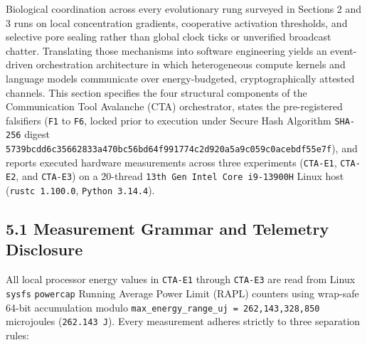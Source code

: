 \documentclass[10pt,letterpaper]{article}
\begin{document}
Biological coordination across every evolutionary rung surveyed in
Sections 2 and 3 runs on local concentration gradients, cooperative
activation thresholds, and selective pore sealing rather than global
clock ticks or unverified broadcast chatter. Translating those
mechanisms into software engineering yields an event-driven
orchestration architecture in which heterogeneous compute kernels and
language models communicate over energy-budgeted, cryptographically
attested channels. This section specifies the four structural components
of the Communication Tool Avalanche (CTA) orchestrator, states the
pre-registered falsifiers (\texttt{F1} to \texttt{F6}, locked prior to
execution under Secure Hash Algorithm \texttt{SHA-256} digest
\texttt{5739bcdd\allowbreak{}6c356628\allowbreak{}33a470bc\allowbreak{}56bd64f9\allowbreak{}91774c2d\allowbreak{}920a5a9c\allowbreak{}059c0ace\allowbreak{}bdf55e7f}),
and reports executed hardware measurements across three experiments
(\texttt{CTA-E1}, \texttt{CTA-E2}, and \texttt{CTA-E3}) on a 20-thread
\texttt{13th\ Gen\ Intel\ Core\ i9-\allowbreak{}13900H} Linux host
(\texttt{rustc\ 1.\allowbreak{}100.\allowbreak{}0}, \texttt{Python\ 3.\allowbreak{}14.\allowbreak{}4}).

\subsection{5.1 Measurement Grammar and Telemetry
Disclosure}\label{measurement-grammar-and-telemetry-disclosure}

All local processor energy values in \texttt{CTA-E1} through
\texttt{CTA-E3} are read from Linux \texttt{sysfs} \texttt{powercap}
Running Average Power Limit (RAPL) counters using wrap-safe 64-bit
accumulation modulo \texttt{max\_\allowbreak{}energy\_\allowbreak{}range\_\allowbreak{}uj\ =\ 262,\allowbreak{}143,\allowbreak{}328,\allowbreak{}850}
microjoules (\texttt{262.\allowbreak{}143\ J}). Every measurement adheres strictly to
three separation rules:
\end{document}
